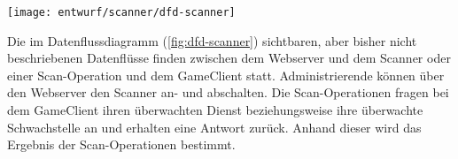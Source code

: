 \begin{center}
	\texttt{[image: entwurf/scanner/dfd-scanner]}
	\label{fig:dfd-scanner}
\end{center}

Die im Datenflussdiagramm (\autoref{fig:dfd-scanner}) sichtbaren, aber bisher nicht beschriebenen Datenflüsse finden zwischen dem Webserver und dem Scanner oder einer Scan-Operation und dem GameClient statt. Administrierende können über den Webserver den Scanner an- und abschalten. Die Scan-Operationen fragen bei dem GameClient ihren überwachten Dienst beziehungsweise ihre überwachte Schwachstelle an und erhalten eine Antwort zurück. Anhand dieser wird das Ergebnis der Scan-Operationen bestimmt.